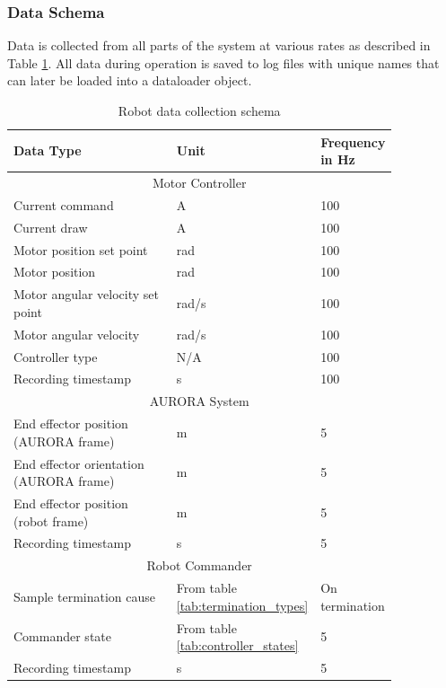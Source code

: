 \subsubsection{Data Schema}
Data is collected from all parts of the system at various rates as described in Table \ref{tab:data_schema}. All data during operation is saved to log files with unique names that can later be loaded into a dataloader object. 

\begin{table}[h]
    \centering   
    \caption{Robot data collection schema}
    \begin{tabular}{p{0.5\linewidth} | p{0.15\linewidth} | p{0.2\linewidth}}
        \textbf{Data Type} & \textbf{Unit} & \textbf{Frequency in Hz} \\
        \hline
        \multicolumn{3}{c}{Motor Controller} \\
        \hline
        Current command & A & 100 \\
        Current draw & A & 100 \\
        Motor position set point & rad & 100 \\
        Motor position & rad & 100 \\
        Motor angular velocity set point & rad/s & 100 \\
        Motor angular velocity & rad/s & 100 \\
        Controller type & N/A & 100 \\
        Recording timestamp & s & 100 \\
        \hline
        \multicolumn{3}{c}{AURORA System} \\
        \hline
        End effector position (AURORA frame) & m & 5 \\
        End effector orientation (AURORA frame) & m & 5 \\
        End effector position (robot frame) & m & 5 \\
        Recording timestamp & s & 5 \\
        \hline
        \multicolumn{3}{c}{Robot Commander} \\
        \hline
        Sample termination cause & From table \ref{tab:termination_types} & On termination \\
        Commander state & From table \ref{tab:controller_states} & 5 \\
        Recording timestamp & s & 5 \\
        \hline
    \end{tabular}
    \label{tab:data_schema}
\end{table}


